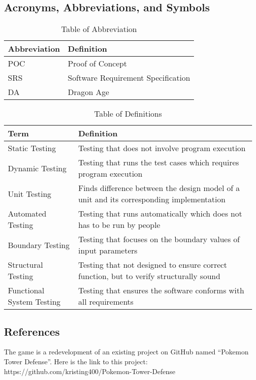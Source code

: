 \documentclass[12,english]{article}
\begin{document}
\newpage
\subsection{Acronyms, Abbreviations, and Symbols}
\newline
\begin{table}[h!]
    \centering
    \begin{tabular}{|p{3cm}|p{6cm}|}
    \hline
    \textbf {Abbreviation} & {Definition}\\
    \hline
    POC & Proof of Concept\\
    \hline
    SRS & Software Requirement Specification\\
    \hline
    DA & Dragon Age\\
    \hline
    \end{tabular}
    \caption{Table of Abbreviation}
\end{table}

\begin{table}[h!]
    \centering
    \begin{tabular}{|p{3cm}|p{8cm}|}
    \hline
    \textbf {Term} & {Definition}\\
    \hline
    Static Testing & Testing that does not involve program execution\\
    \hline
    Dynamic Testing & Testing that runs the test cases which requires program execution\\
    \hline
    Unit Testing & Finds difference between the design model of a unit and its corresponding implementation\\
    \hline
    Automated Testing & Testing that runs automatically which does not has to be run by people\\
    \hline
    Boundary Testing & Testing that focuses on the boundary values of input parameters\\
    \hline
    Structural Testing & Testing that not designed to ensure correct function, but to verify structurally sound\\
    \hline
    Functional System Testing & Testing that ensures the software conforms with all requirements\\
    \hline
    \end{tabular}
    \caption{Table of Definitions}
\end{table}

\subsection{References}
The game is a redevelopment of an existing project on GitHub named “Pokemon Tower Defense”. Here is the link to this project: 
https://github.com/kristing400/Pokemon-Tower-Defense
\end{document}
